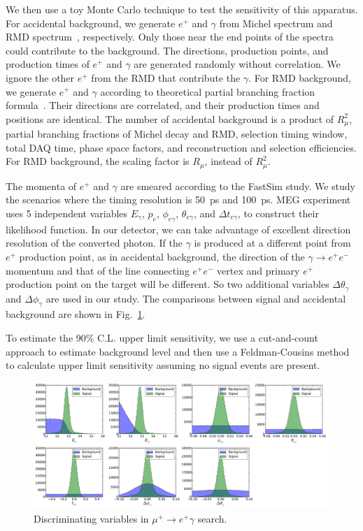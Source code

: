 We then use a toy Monte Carlo technique to test the sensitivity of this
apparatus.
For accidental background, we generate $e^+$ and $\gamma$ from Michel
spectrum and RMD spectrum~\cite{Kuno:1999jp}, respectively. Only those 
near the end points of the spectra could contribute to the background.
The directions, production points, and production times of $e^+$ and 
$\gamma$ are generated
randomly without correlation. We ignore the other $e^+$ from the RMD that
contribute the $\gamma$.
For RMD background, we generate $e^+$ and $\gamma$ according to theoretical
partial branching fraction formula~\cite{Kuno:1999jp}. Their directions are
correlated, and their production times and positions are identical.
The number of accidental background is a product of $R_\mu^2$, partial
branching fractions of Michel decay and RMD, selection timing window,
total DAQ time, phase space factors, and reconstruction and selection 
efficiencies. For RMD background, the scaling factor is $R_\mu$, instead of
$R_\mu^2$.

The momenta 
of $e^+$ and $\gamma$ are smeared according to the FastSim study. 
We study the scenarios where the timing resolution is 50~ps and 100~ps. 
MEG experiment uses 5 independent variables $E_\gamma$, $p_e$, 
$\phi_{e\gamma}$, $\theta_{e\gamma}$, and $\Delta t_{e\gamma}$, to construct
their likelihood function. In our detector, we can take advantage of excellent
direction resolution of the converted photon. If the $\gamma$ is produced
at a different point from $e^+$ production point, as in accidental background,
 the direction of the $\gamma\to e^+e^-$ momentum and that of the line
connecting $e^+e^-$ vertex and primary $e^+$ production point on the target
will be different. So two additional variables $\Delta\theta_\gamma$ 
and $\Delta\phi_\gamma$ are used in our study. The comparisons between signal
and accidental background are shown in Fig.~\ref{fig:muegamma-vars}.

To estimate the 90\% C.L. upper limit sensitivity, we use a cut-and-count
approach to estimate background level and then use a Feldman-Cousins 
method~\cite{Feldman:1997qc} to calculate upper limit sensitivity assuming
no signal events are present.



\begin{figure}[htbp]
\includegraphics[width=0.99\textwidth]{Figures/sens-vardists-50ps.pdf}
\caption{Discriminating variables in $\mu^+\to e^+\gamma$ search.}
\label{fig:muegamma-vars}
\end{figure}

